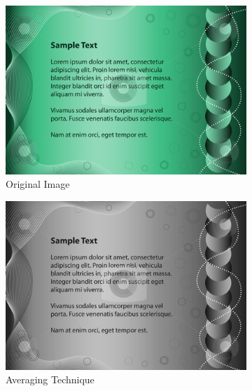 \begin{figure}[H]
\hspace*{\fill} %
\begin{subfigure}{0.31\textwidth}
\includegraphics[width=\linewidth]{img/grayscale_orig.jpg}
\caption{Original Image} \label{fig:1a}
\end{subfigure}
\hspace*{\fill} %
\begin{subfigure}{0.31\textwidth}
\includegraphics[width=\linewidth]{img/grayscale_avg.png}
\caption{Averaging Technique} \label{fig:1b}
\end{subfigure}
\hspace*{\fill} %
\begin{subfigure}{0.31\textwidth}

\end{subfigure}
\end{figure}
